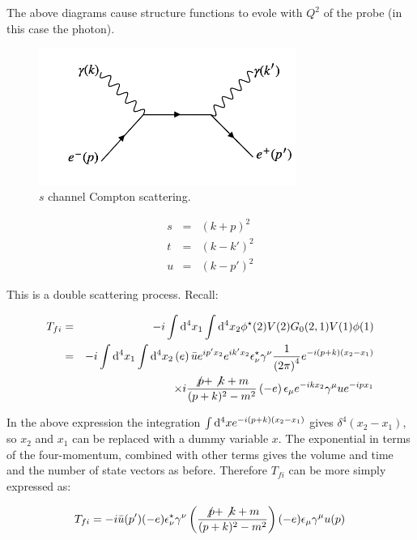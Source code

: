 The above diagrams cause structure functions to evole with $Q^2$ of the probe (in this case the photon).

\begin{figure}[!htb]
  \begin{center}
    \includegraphics[width=0.75\textwidth]{images/web_feynman/image_40.png}
    \caption[$s$ channel Compton scattering]{$s$ channel Compton scattering.}
    \label{fig:ch11_ComptonSChannel}
  \end{center}
\end{figure}

\begin{eqnarray*}
  s & = & (k + p)^2  \\
  t & = & (k - k')^2 \\
  u & = & (k - p')^2
\end{eqnarray*}

This is a double scattering process.  Recall:

\begin{eqnarray*}
  T_{fi} & = & -i\int\mathrm{d}^4x_1\int\mathrm{d}^4x_2\phi^{\star}(2)V(2)G_0(2,1)V(1)\phi(1) \\
  & = & -i\int\mathrm{d}^4x_1\int\mathrm{d}^4x_2\left(e\right)\bar{u}e^{ip'x_2}e^{ik'x_2}\epsilon^{\star}_{\nu}\gamma^{\nu}\frac{1}{\left(2\pi\right)^4}e^{-i(p + k)(x_2 - x_1)}\\
  &   & \times i\frac{\not{p} + \not{k} + m}{(p + k)^2 - m^2}\left(-e\right)\epsilon_{\mu}e^{-ikx_2}\gamma^{\mu}ue^{-ipx_1}
\end{eqnarray*}

In the above expression the integration $\int\mathrm{d}^4xe^{-i(p + k)(x_2 - x_1)}$ gives $\delta^4(x_2 - x_1)$, so $x_2$ and $x_1$ can be replaced with a dummy variable $x$.  The exponential in terms of the four-momentum, combined with other terms gives the volume and time and the number of state vectors as before.  Therefore $T_{fi}$ can be more simply expressed as:

\[
  T_{fi} = -i\bar{u}(p')(-e)\epsilon^{\star}_{\nu}\gamma^{\nu}
           \left(\frac{\not{p} + \not{k} + m}{(p + k)^2 - m^2}\right)
           (-e)\epsilon_{\mu}\gamma^{\mu}u(p)
\]

